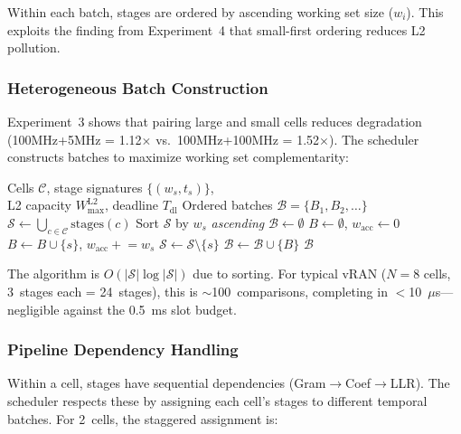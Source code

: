 Within each batch, stages are ordered by ascending working set size ($w_i$). This exploits the finding from Experiment~4 that small-first ordering reduces L2 pollution.

\subsubsection{Heterogeneous Batch Construction}

Experiment~3 shows that pairing large and small cells reduces degradation (100MHz+5MHz = 1.12$\times$ vs.\ 100MHz+100MHz = 1.52$\times$). The scheduler constructs batches to maximize working set complementarity:

\begin{algorithm}[h]
\caption{L2-aware stage co-scheduling}
\label{alg:cosched}
\begin{algorithmic}[1]
\Require Cells $\mathcal{C}$, stage signatures $\{(w_s, t_s)\}$,\\
\quad\quad\quad L2 capacity $W^{\text{L2}}_{\text{max}}$, deadline $T_{\text{dl}}$
\Ensure Ordered batches $\mathcal{B} = \{B_1, B_2, \ldots\}$
\State $\mathcal{S} \gets \bigcup_{c \in \mathcal{C}} \text{stages}(c)$ 
\State Sort $\mathcal{S}$ by $w_s$ \emph{ascending}
\State $\mathcal{B} \gets \emptyset$
  \State $B \gets \emptyset$, $w_{\text{acc}} \gets 0$
   
      \State $B \gets B \cup \{s\}$, $w_{\text{acc}} \mathrel{+}= w_s$
      \State $\mathcal{S} \gets \mathcal{S} \setminus \{s\}$
    \EndIf
  \EndFor
  \State {}
  \State $\mathcal{B} \gets \mathcal{B} \cup \{B\}$
\EndWhile
\State \Return $\mathcal{B}$
\end{algorithmic}
\end{algorithm}

The algorithm is $O(|\mathcal{S}| \log |\mathcal{S}|)$ due to sorting. For typical vRAN ($N=8$ cells, 3~stages each = 24~stages), this is $\sim$100~comparisons, completing in $<$10~$\mu$s---negligible against the 0.5~ms slot budget.

\subsubsection{Pipeline Dependency Handling}

Within a cell, stages have sequential dependencies (Gram$\rightarrow$Coef$\rightarrow$LLR). The scheduler respects these by assigning each cell's stages to different temporal batches. For 2~cells, the staggered assignment is:

